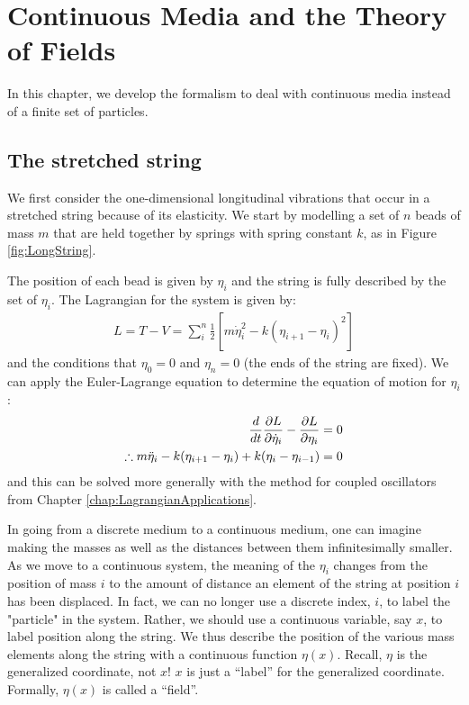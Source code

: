 \chapter{Continuous Media and the Theory of Fields}
In this chapter, we develop the formalism to deal with continuous media instead of a finite set of particles. 

\section{The stretched string}
We first consider the one-dimensional longitudinal vibrations that occur in a stretched string because of its elasticity. We start by modelling a set of $n$ beads of mass $m$ that are held together by springs with spring constant $k$, as in Figure \ref{fig:LongString}.

The position of each bead is given by $\eta_i$ and the string is fully described by the set of $\eta_i$. The Lagrangian for the system is given by:
\begin{align}
L=T-V=\sum_i^n \frac{1}{2}\left[m\dot\eta_i^2-k(\eta_{i+1}-\eta_i)^2\right]
\end{align}
and the conditions that $\eta_0=0$ and $\eta_n=0$ (the ends of the string are fixed). We can apply the Euler-Lagrange equation to determine the equation of motion for $\eta_i$:
\begin{align}
\frac{d}{dt}\frac{\partial L}{\partial \dot\eta_i}-\frac{\partial L}{\partial \eta_i}&=0\nonumber\\
\therefore m\ddot\eta_i-k(\eta_{i+1}-\eta_i)+k(\eta_i-\eta_{i-1})&=0
\end{align}
and this can be solved more generally with the method for coupled oscillators from Chapter \ref{chap:LagrangianApplications}.

In going from a discrete medium to a continuous medium, one can imagine making the masses as well as the distances between them infinitesimally smaller. As we move to a continuous system, the meaning of the $\eta_i$ changes from the position of mass $i$ to the amount of distance an element of the string at position $i$ has been displaced. In fact, we can no longer use a discrete index, $i$, to label the "particle" in the system. Rather, we should use a continuous variable, say $x$, to label position along the string. We thus describe the position of the various mass elements along the string with a continuous function $\eta(x)$. Recall, $\eta$ is the generalized coordinate, not $x$! $x$ is just a ``label'' for the generalized coordinate. Formally, $\eta(x)$ is called a ``field''.

